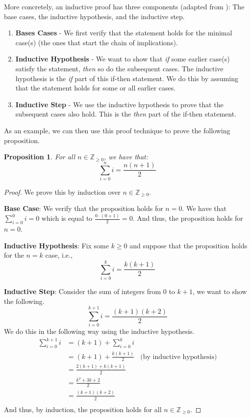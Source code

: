 \documentclass{article}
\theoremstyle{plain}
\newtheorem{proposition}[theorem]{Proposition}
\theoremstyle{definition}
\newcommand{\ZZ}{\mathbb{Z}_{\geq 0}}
\begin{document}
More concretely, an inductive proof has three components (adapted from \cite{levet_algorithms_2019}): The base cases, the inductive hypothesis, and the inductive step.

\begin{enumerate}
    \item \textbf{Bases Cases} - We first verify that the statement holds for the minimal case(s) (the ones that start the chain of implications).
    \item \textbf{Inductive Hypothesis} - We want to show that \emph{if} some earlier case(s) satisfy the statement, \emph{then} so do the subsequent cases. The inductive hypothesis is the \emph{if} part of this if-then statement. We do this by assuming that the statement holds for some or all earlier cases.
    \item \textbf{Inductive Step} - We use the inductive hypothesis to prove that the subsequent cases also hold. This is the \emph{then} part of the if-then statement.
\end{enumerate}

As an example, we can then use this proof technique to prove the following proposition.

\begin{proposition}\label{prop1}
    For all \(n \in \ZZ\), we have that:
    \[\sum_{i=0}^n i = \frac{n(n+1)}{2}\]
\end{proposition}
\begin{proof}
    We prove this by induction over \(n \in \ZZ\).
    
    \textbf{Base Case}: We verify that the proposition holds for \(n=0\). We have that \(\sum_{i=0}^0 i = 0\) which is equal to \(\frac{0 \cdot (0 + 1)}{2} = 0\). And thus, the proposition holds for \(n=0\).

    \textbf{Inductive Hypothesis}: Fix some \(k \geq 0\) and suppose that the proposition holds for the \(n=k
    \) case, i.e.,
    \[\sum_{i=0}^k i = \frac{k(k+1)}{2}\]

    \textbf{Inductive Step}: Consider the sum of integers from \(0\) to \(k+1\), we want to show the following.
    \[\sum_{i=0}^{k+1} i = \frac{(k+1)(k+2)}{2}\]
    We do this in the following way using the inductive hypothesis.
    \begin{align*}
        \sum_{i=0}^{k+1} i &= (k+1) + \sum_{i = 0}^{k} i \\
        &= (k+1) + \frac{k(k+1)}{2}\ \ \ \ \text{(by inductive hypothesis)} \\
        &= \frac{2(k+1) + k(k+1)}{2} \\
        &= \frac{k^2 + 3k + 2}{2} \\ 
        &= \frac{(k+1)(k+2)}{2} \\ 
    \end{align*}
    And thus, by induction, the proposition holds for all \(n \in \ZZ\).
\end{proof}
\end{document}
